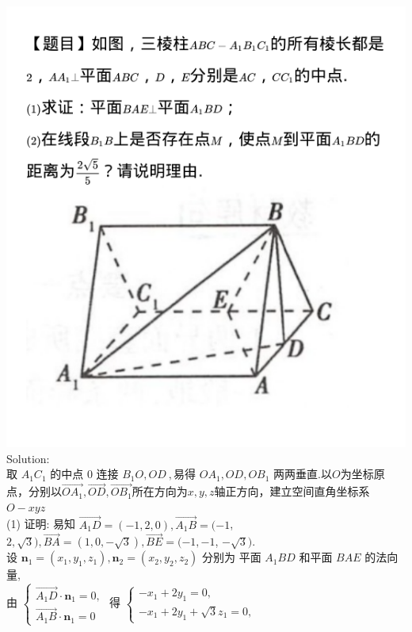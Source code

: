 \documentclass[a4paper,11pt,UTF8]{article}
\begin{document}
\includegraphics[scale=0.5]{./P16T7.jpg}\\
Solution:\\
取 $A_{1}C_{1}$ 的中点 $\text{0}$ 连接 $B_1O,OD\:,$易得 $OA_1,OD,OB_1$ 两两垂直.以$O$为坐标原点，分别以$\overrightarrow{OA_1},\overrightarrow{OD},\overrightarrow{OB_1}$所在方向为$x,y,z$轴正方向，建立空间直角坐标系$O-xyz$\\
(1) 证明: 易知 $\overrightarrow{A_1 D}=(-1,2,0), \overrightarrow{A_1 B}=(-1$, $2, \sqrt{3}), \overrightarrow{B A}=(1,0,-\sqrt{3}), \overrightarrow{B E}=(-1,-1$, $-\sqrt{3})$.\\
设 $\boldsymbol{n}_1=\left(x_1, y_1, z_1\right), \boldsymbol{n}_2=\left(x_2, y_2, z_2\right)$ 分别为 平面 $A_1 B D$ 和平面 $B A E$ 的法向量,\\
由 $\left\{\begin{array}{l}\overrightarrow{A_1 D} \cdot \boldsymbol{n}_1=0, \\ \overrightarrow{A_1 B} \cdot \boldsymbol{n}_1=0\end{array}\right.$ 得 $\left\{\begin{array}{l}-x_1+2 y_1=0, \\ -x_1+2 y_1+\sqrt{3} z_1=0,\end{array}\right.$\\ 
\end{document}
